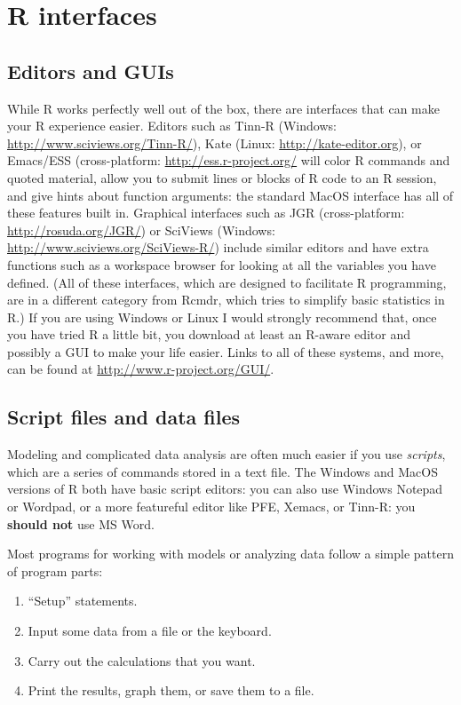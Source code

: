 \documentclass[11pt,]{article}
\begin{document}
\section{R interfaces}\label{r-interfaces}

\subsection{Editors and GUIs}\label{editors-and-guis}

While R works perfectly well out of the box, there are interfaces that
can make your R experience easier. Editors such as Tinn-R (Windows:
\url{http://www.sciviews.org/Tinn-R/}), Kate (Linux:
\url{http://kate-editor.org}), or Emacs/ESS (cross-platform:
\url{http://ess.r-project.org/} will color R commands and quoted
material, allow you to submit lines or blocks of R code to an R session,
and give hints about function arguments: the standard MacOS interface
has all of these features built in. Graphical interfaces such as JGR
(cross-platform: \url{http://rosuda.org/JGR/}) or SciViews (Windows:
\url{http://www.sciviews.org/SciViews-R/}) include similar editors and
have extra functions such as a workspace browser for looking at all the
variables you have defined. (All of these interfaces, which are designed
to facilitate R programming, are in a different category from Rcmdr,
which tries to simplify basic statistics in R.) If you are using Windows
or Linux I would strongly recommend that, once you have tried R a little
bit, you download at least an R-aware editor and possibly a GUI to make
your life easier. Links to all of these systems, and more, can be found
at \url{http://www.r-project.org/GUI/}.

\subsection{Script files and data
files}\label{script-files-and-data-files}

Modeling and complicated data analysis are often much easier if you use
\emph{scripts}, which are a series of commands stored in a text file.
The Windows and MacOS versions of R both have basic script editors: you
can also use Windows Notepad or Wordpad, or a more featureful editor
like PFE, Xemacs, or Tinn-R: you \textbf{should not} use MS Word.

Most programs for working with models or analyzing data follow a simple
pattern of program parts:

\begin{enumerate}
\def\labelenumi{\arabic{enumi}.}
\item
  ``Setup'' statements.
\item
  Input some data from a file or the keyboard.
\item
  Carry out the calculations that you want.
\item
  Print the results, graph them, or save them to a file.
\end{enumerate}
\end{document}
